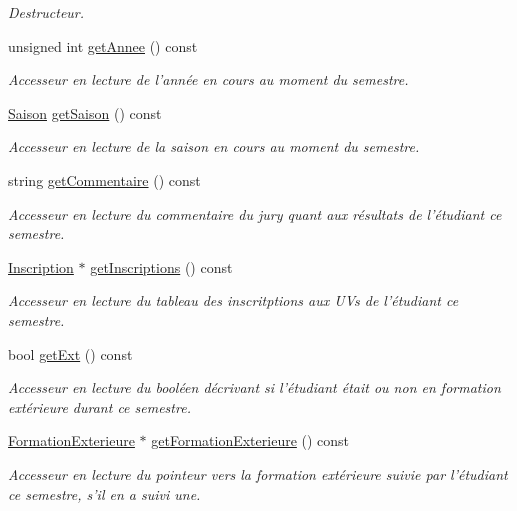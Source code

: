 \begin{DoxyCompactItemize}
\begin{DoxyCompactList}\small\item\em Destructeur. \end{DoxyCompactList}\item 
unsigned int \hyperlink{class_semestre_a5aa85395e97f58f491ebf251da8231ef}{get\-Annee} () const 
\begin{DoxyCompactList}\small\item\em Accesseur en lecture de l'année en cours au moment du semestre. \end{DoxyCompactList}\item 
\hyperlink{_u_t_profiler_8h_a72fcaae0ef529616dd62b747e259d545}{Saison} \hyperlink{class_semestre_a26e25575e7fb65649c47970a9800c3aa}{get\-Saison} () const 
\begin{DoxyCompactList}\small\item\em Accesseur en lecture de la saison en cours au moment du semestre. \end{DoxyCompactList}\item 
string \hyperlink{class_semestre_aa6f8274d5868ee938767865bb8e66c25}{get\-Commentaire} () const 
\begin{DoxyCompactList}\small\item\em Accesseur en lecture du commentaire du jury quant aux résultats de l'étudiant ce semestre. \end{DoxyCompactList}\item 
\hyperlink{class_inscription}{Inscription} $\ast$ \hyperlink{class_semestre_ac1724b1d1c28eb943496004b44645365}{get\-Inscriptions} () const 
\begin{DoxyCompactList}\small\item\em Accesseur en lecture du tableau des inscritptions aux U\-Vs de l'étudiant ce semestre. \end{DoxyCompactList}\item 
bool \hyperlink{class_semestre_aac6af5aa5fc34383afc56a68862329e2}{get\-Ext} () const 
\begin{DoxyCompactList}\small\item\em Accesseur en lecture du booléen décrivant si l'étudiant était ou non en formation extérieure durant ce semestre. \end{DoxyCompactList}\item 
\hyperlink{class_formation_exterieure}{Formation\-Exterieure} $\ast$ \hyperlink{class_semestre_afeafdde29055295918dc26b31d1980a0}{get\-Formation\-Exterieure} () const 
\begin{DoxyCompactList}\small\item\em Accesseur en lecture du pointeur vers la formation extérieure suivie par l'étudiant ce semestre, s'il en a suivi une. \end{DoxyCompactList}\item 

\end{DoxyCompactItemize}
